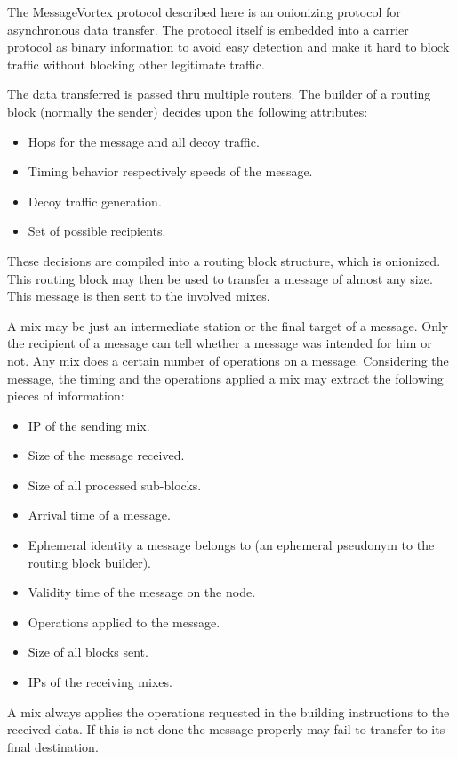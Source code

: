 The MessageVortex protocol described here is an onionizing protocol for asynchronous data transfer. The protocol itself is embedded into a carrier protocol as binary information to avoid easy detection and make it hard to block traffic without blocking other legitimate traffic.

The data transferred is passed thru multiple routers. The builder of a routing block (normally the sender) decides upon the following attributes:
\begin{itemize}
	\item Hops for the message and all decoy traffic.
	\item Timing behavior respectively speeds of the message.
	\item Decoy traffic generation.
	\item Set of possible recipients.
\end{itemize}

These decisions are compiled into a routing block structure, which is onionized. This routing block may then be used to transfer a message of almost any size. This message is then sent to the involved mixes.

A mix may be just an intermediate station or the final target of a message. Only the recipient of a message can tell whether a message was intended for him or not. Any mix does a certain number of operations on a message. Considering the message, the timing and the operations applied a mix may extract the following pieces of information:

\begin{itemize}
	\item IP of the sending mix.
	\item Size of the message received.
	\item Size of all processed sub-blocks.
	\item Arrival time of a message.
	\item Ephemeral identity a message belongs to (an ephemeral pseudonym to the routing block builder).
	\item Validity time of the message on the node.
	\item Operations applied to the message.
	\item Size of all blocks sent.
	\item IPs of the receiving mixes.
\end{itemize}

A mix always applies the operations requested in the building instructions to the received data. If this is not done the message properly may fail to transfer to its final destination. 

